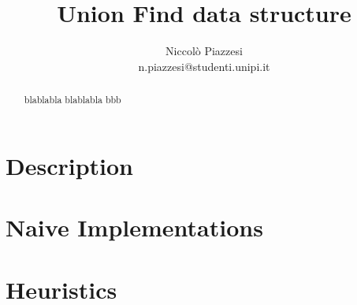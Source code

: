\documentclass{article}
\begin{document}
\title{ \textbf{Union Find data structure}}
\author{Niccolò Piazzesi\\n.piazzesi@studenti.unipi.it}
\date{}
\maketitle
\begin{abstract}
    blablabla blablabla bbb
\end{abstract}
\section{Description}
\section{Naive Implementations}
 \cite{demetrescu}
\section{Heuristics}



\end{document}
